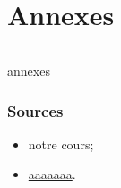 
\part*{Annexes}
    \paragraph{}
annexes

    \clearpage

    \section*{Sources}
        \begin{itemize}
            \item notre cours;
            \item \url{aaaaaaa}.
        \end{itemize}

